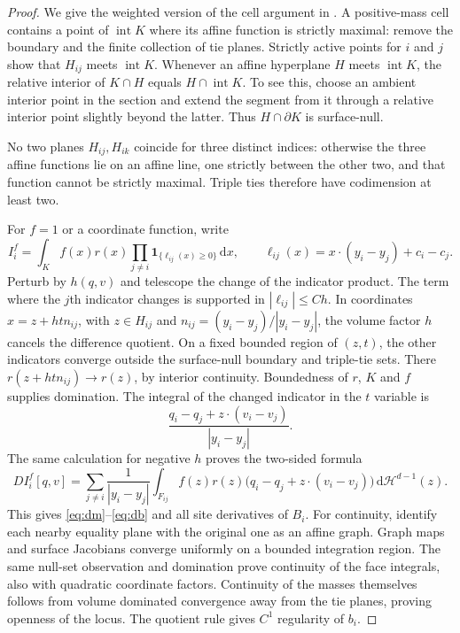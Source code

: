 \documentclass[11pt]{article}
\numberwithin{equation}{section}
\theoremstyle{remark}
\newcommand{\ind}{\mathbf 1}
\newcommand{\dd}{\,\mathrm d}
\newcommand{\interior}{\operatorname{int}}
\begin{document}
\begin{proof}
We give the weighted version of the cell argument in \cite{OpenAI2026}. A positive-mass cell contains a point of $\interior K$ where its affine function is strictly maximal: remove the boundary and the finite collection of tie planes. Strictly active points for $i$ and $j$ show that $H_{ij}$ meets $\interior K$. Whenever an affine hyperplane $H$ meets $\interior K$, the relative interior of $K\cap H$ equals $H\cap\interior K$. To see this, choose an ambient interior point in the section and extend the segment from it through a relative interior point slightly beyond the latter. Thus $H\cap\partial K$ is surface-null.

No two planes $H_{ij},H_{ik}$ coincide for three distinct indices: otherwise the three affine functions lie on an affine line, one strictly between the other two, and that function cannot be strictly maximal. Triple ties therefore have codimension at least two.

For $f=1$ or a coordinate function, write
\[
 I_i^f=\int_K f(x)r(x)\prod_{j\ne i}\ind_{\{\ell_{ij}(x)\ge0\}}\dd x,
 \qquad \ell_{ij}(x)=x\cdot(y_i-y_j)+c_i-c_j.
\]
Perturb by $h(q,v)$ and telescope the change of the indicator product. The term where the $j$th indicator changes is supported in $|\ell_{ij}|\le Ch$. In coordinates
$x=z+htn_{ij}$, with $z\in H_{ij}$ and $n_{ij}=(y_i-y_j)/|y_i-y_j|$, the volume factor $h$ cancels the difference quotient. On a fixed bounded region of $(z,t)$, the other indicators converge outside the surface-null boundary and triple-tie sets. There $r(z+htn_{ij})\to r(z)$, by interior continuity. Boundedness of $r$, $K$ and $f$ supplies domination. The integral of the changed indicator in the $t$ variable is
\[
 \frac{q_i-q_j+z\cdot(v_i-v_j)}{|y_i-y_j|}.
\]
The same calculation for negative $h$ proves the two-sided formula
\[
 DI_i^f[q,v]=\sum_{j\ne i}\frac1{|y_i-y_j|}
  \int_{F_{ij}}f(z)r(z)
       \bigl(q_i-q_j+z\cdot(v_i-v_j)\bigr)\dd\mathcal H^{d-1}(z).
\]
This gives \eqref{eq:dm}--\eqref{eq:db} and all site derivatives of $B_i$.
For continuity, identify each nearby equality plane with the original one as an affine graph. Graph maps and surface Jacobians converge uniformly on a bounded integration region. The same null-set observation and domination prove continuity of the face integrals, also with quadratic coordinate factors. Continuity of the masses themselves follows from volume dominated convergence away from the tie planes, proving openness of the locus. The quotient rule gives $C^1$ regularity of $b_i$.


\end{proof}
\end{document}
